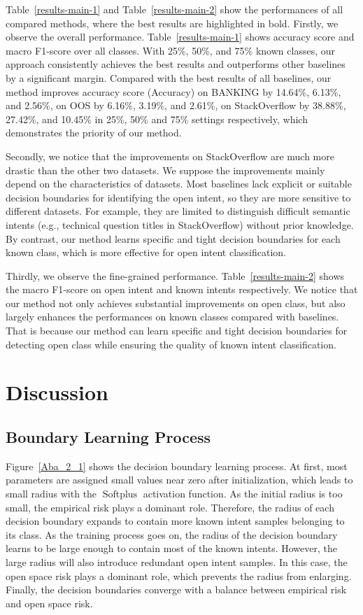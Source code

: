 \documentclass[letterpaper]{article} %
\begin{document}
Table~\ref{results-main-1} and Table~\ref{results-main-2} show the performances of all compared methods, where the best results are highlighted in bold. Firstly, we observe the overall performance. Table~\ref{results-main-1} shows  accuracy score and macro F1-score over all classes. With 25\%, 50\%, and 75\% known classes, our approach consistently achieves the best results and outperforms other baselines by a significant margin. Compared with the best results of all baselines, our method improves accuracy score (Accuracy) on BANKING by 14.64\%, 6.13\%, and 2.56\%, on OOS by 6.16\%, 3.19\%, and 2.61\%, on StackOverflow by 38.88\%, 27.42\%, and 10.45\% in 25\%, 50\% and 75\% settings respectively, which demonstrates the priority of our method.

Secondly, we notice that the improvements on StackOverflow are much more drastic than the other two datasets. We suppose the improvements mainly depend on the characteristics of datasets. Most baselines lack explicit or suitable decision boundaries for identifying the open intent, so they are more sensitive to different datasets. For example, they are limited to distinguish difficult semantic intents (e.g., technical question titles in StackOverflow) without prior knowledge. By contrast, our method learns specific and tight decision boundaries for each known class, which is more effective for open intent classification.

Thirdly, we observe the fine-grained performance. Table~\ref{results-main-2} shows the macro F1-score on open intent and known intents respectively. We notice that our method not only achieves substantial improvements on open class, but also largely enhances the performances on known classes compared with baselines. That is because our method can learn specific and tight decision boundaries for detecting open class while ensuring the quality of known intent classification.

\section{Discussion}

\subsection{Boundary Learning Process}
Figure~\ref{Aba_2_1} shows the decision boundary learning process. At first, most parameters are assigned small values near zero after initialization, which leads to small radius with the $\operatorname{Softplus} $ activation function. As the initial radius is too small, the empirical risk plays a dominant role. Therefore, the radius of each decision boundary expands to contain more known intent samples belonging to its class. As the training process goes on, the radius of the decision boundary learns to be large enough to contain most of the known intents. However, the large radius will also introduce redundant open intent samples. In this case, the open space risk plays a dominant role, which prevents the radius from enlarging. Finally, the decision boundaries converge with a balance between empirical risk and open space risk.
\end{document}
